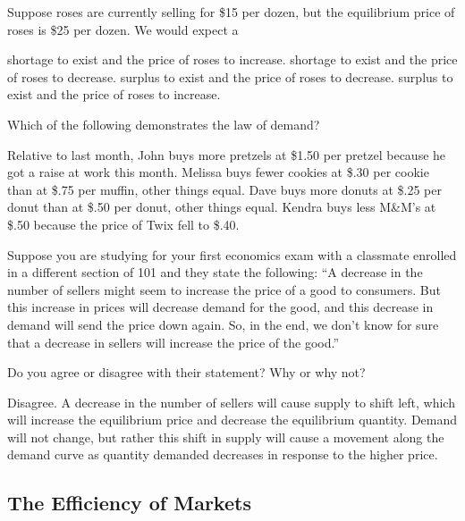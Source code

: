\documentclass[addpoints,11pt]{exam}
\theoremstyle{definition}
\begin{document}
\begin{questions}
\question Suppose roses are currently selling for \$15 per dozen, but the equilibrium price of roses is \$25 per dozen. We would expect a 

\begin{choices}
	\CorrectChoice shortage to exist and the price of roses to increase.
	\choice shortage to exist and the price of roses to decrease.
	\choice surplus to exist and the price of roses to decrease.
	\choice surplus to exist and the price of roses to increase.
\end{choices}


\question Which of the following demonstrates the law of demand?

\begin{choices}
	\choice Relative to last month, John buys more pretzels at \$1.50 per pretzel because he got a raise at work this month.
	\choice Melissa buys fewer cookies at \$.30 per cookie than at \$.75 per muffin, other things equal.
	\CorrectChoice Dave buys more donuts at \$.25 per donut than at \$.50 per donut, other things equal.
	\choice Kendra buys less M\&M's at \$.50 because the price of Twix fell to \$.40.
\end{choices}
		
		\question Suppose you are studying for your first economics exam with a classmate enrolled in a different section of 101 and they state the following: ``A decrease in the number of sellers might seem to increase the price of a good to consumers. But this increase in prices will decrease demand for the good, and this decrease in demand will send the price down again. So, in the end, we don't know for sure that a decrease in sellers will increase the price of the good.'' 
		
		Do you agree or disagree with their statement? Why or why not? 
		
		\begin{solution}
			Disagree. A decrease in the number of sellers will cause supply to shift left, which will increase the equilibrium price and decrease the equilibrium quantity. Demand will not change, but rather this shift in supply will cause a movement along the demand curve as quantity demanded decreases in response to the higher price.
		\end{solution}
		
\end{questions}

\subsection*{The Efficiency of Markets}
	
\end{document}
